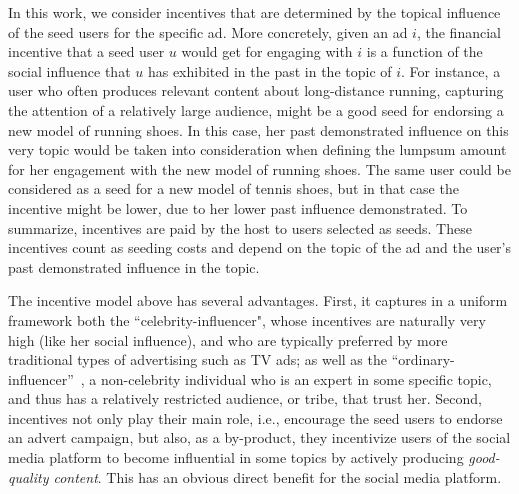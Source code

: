 
In this work, we consider incentives that are
determined by the topical influence of the seed users for the specific ad. More concretely, given an ad $i$, the financial incentive that a seed user $u$ would get for engaging with $i$ is a function of the social influence that $u$ has exhibited in the past in the topic of $i$. For instance, a user who  often produces relevant content about long-distance running, capturing the attention of a relatively large audience, might be a good seed for endorsing a new model of running shoes. In this case, her past demonstrated influence on this very topic would be taken into consideration when defining the lumpsum amount for her engagement with the new model of running shoes. The same user could be considered as a seed for a new model of tennis shoes, but in that case the incentive might be lower, due to her lower past influence demonstrated. To summarize, incentives are paid by the host to users selected as seeds. These incentives count as seeding costs and depend on the topic of the ad and the user's past demonstrated influence in the topic.

The incentive model above has several advantages. First, it captures in a uniform framework both the ``celebrity-influencer", whose incentives are naturally very high (like her social influence), and who are typically preferred by more traditional types of advertising such as TV ads; as well as the ``ordinary-influencer''~\cite{bakshy2011}, a non-celebrity individual who is an expert in some specific topic, and thus has a relatively restricted audience, or tribe, that trust her. Second, incentives not only play their main role, i.e., encourage the seed users to endorse an advert campaign, but also, as a by-product, they incentivize users of the social media platform to become  influential in some topics by actively producing \emph{good-quality content}.  This has an obvious direct benefit for the social media platform.


